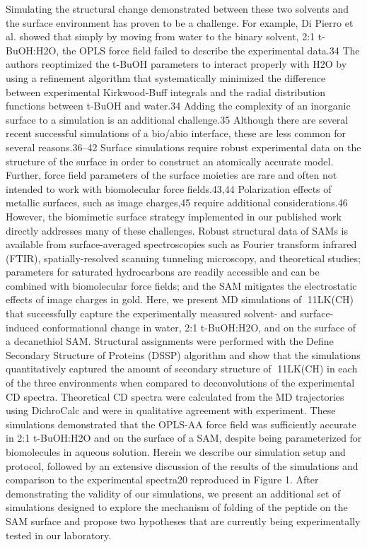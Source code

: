 Simulating the structural change demonstrated between these two solvents and the surface environment has proven to be a challenge. For example, Di Pierro et al. showed that simply by moving from water to the binary solvent, 2:1 t-BuOH:H2O, the OPLS force field failed to describe the experimental data.34 The authors reoptimized the t-BuOH parameters to interact properly with H2O by using a refinement algorithm that systematically minimized the difference between experimental Kirkwood-Buff integrals and the radial distribution functions between t-BuOH and water.34 Adding the complexity of an inorganic surface to a simulation is an additional challenge.35 Although there are several recent successful simulations of a bio/abio interface, these are less common for several reasons.36–42 Surface simulations require robust experimental data on the structure of the surface in order to construct an atomically accurate model. Further, force field parameters of the surface moieties are rare and often not intended to work with biomolecular force fields.43,44 Polarization effects of metallic surfaces, such as image charges,45 require additional considerations.46 However, the biomimetic surface strategy implemented in our published work directly addresses many of these challenges. Robust structural data of SAMs is available from surface-averaged spectroscopies such as Fourier transform infrared (FTIR), spatially-resolved scanning tunneling microscopy, and theoretical studies; parameters for saturated hydrocarbons are readily accessible and can be combined with biomolecular force fields; and the SAM mitigates the electrostatic effects of image charges in gold.
Here, we present MD simulations of 11LK(CH) that successfully capture the experimentally measured solvent- and surface-induced conformational change in water, 2:1 t-BuOH:H2O, and on the surface of a decanethiol SAM. Structural assignments were performed with the Define Secondary Structure of Proteins (DSSP) algorithm and show that the simulations quantitatively captured the amount of secondary structure of 11LK(CH) in each of the three environments when compared to deconvolutions of the experimental CD spectra. Theoretical CD spectra were calculated from the MD trajectories using DichroCalc and were in qualitative agreement with experiment. These simulations demonstrated that the OPLS-AA force field was sufficiently accurate in 2:1 t-BuOH:H2O and on the surface of a SAM, despite being parameterized for biomolecules in aqueous solution. Herein we describe our simulation setup and protocol, followed by an extensive discussion of the results of the simulations and comparison to the experimental spectra20 reproduced in Figure 1. After demonstrating the validity of our simulations, we present an additional set of simulations designed to explore the mechanism of folding of the peptide on the SAM surface and propose two hypotheses that are currently being experimentally tested in our laboratory.

